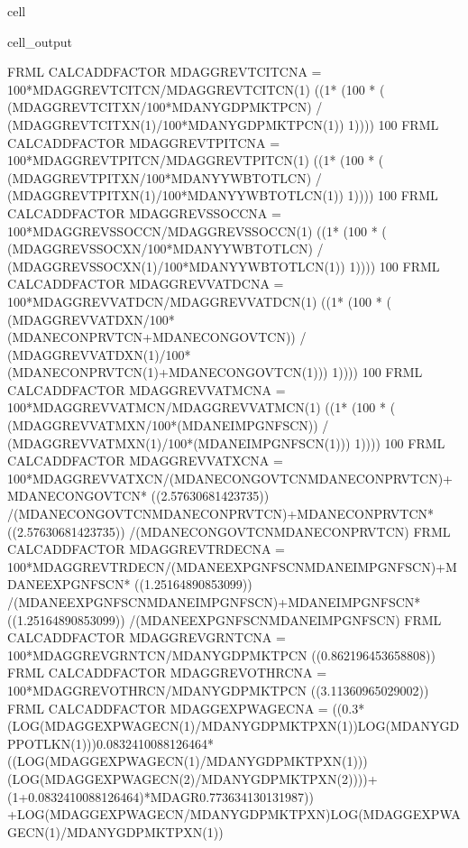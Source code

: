 \documentclass[letterpaper,10pt,english]{jupyterBook}
\begin{document}
\begin{sphinxuseclass}{cell}
\begin{sphinxVerbatimOutput}
\begin{sphinxuseclass}{cell_output}
\begin{sphinxVerbatim}[commandchars=\\\{\}]
FRML \PYGZlt{}CALC\PYGZus{}ADD\PYGZus{}FACTOR\PYGZgt{} MDAGGREVTCITCN\PYGZus{}A = 100*MDAGGREVTCITCN/MDAGGREVTCITCN(\PYGZhy{}1)\PYGZhy{} ((1* (100 * ( (MDAGGREVTCITXN/100*MDANYGDPMKTPCN) / (MDAGGREVTCITXN(\PYGZhy{}1)/100*MDANYGDPMKTPCN(\PYGZhy{}1)) \PYGZhy{}1)))) \PYGZhy{}100\PYGZdl{}
FRML \PYGZlt{}CALC\PYGZus{}ADD\PYGZus{}FACTOR\PYGZgt{} MDAGGREVTPITCN\PYGZus{}A = 100*MDAGGREVTPITCN/MDAGGREVTPITCN(\PYGZhy{}1)\PYGZhy{} ((1* (100 * ( (MDAGGREVTPITXN/100*MDANYYWBTOTLCN) / (MDAGGREVTPITXN(\PYGZhy{}1)/100*MDANYYWBTOTLCN(\PYGZhy{}1)) \PYGZhy{}1)))) \PYGZhy{}100\PYGZdl{}
FRML \PYGZlt{}CALC\PYGZus{}ADD\PYGZus{}FACTOR\PYGZgt{} MDAGGREVSSOCCN\PYGZus{}A = 100*MDAGGREVSSOCCN/MDAGGREVSSOCCN(\PYGZhy{}1)\PYGZhy{} ((1* (100 * ( (MDAGGREVSSOCXN/100*MDANYYWBTOTLCN) / (MDAGGREVSSOCXN(\PYGZhy{}1)/100*MDANYYWBTOTLCN(\PYGZhy{}1)) \PYGZhy{}1)))) \PYGZhy{}100\PYGZdl{}
FRML \PYGZlt{}CALC\PYGZus{}ADD\PYGZus{}FACTOR\PYGZgt{} MDAGGREVVATDCN\PYGZus{}A = 100*MDAGGREVVATDCN/MDAGGREVVATDCN(\PYGZhy{}1)\PYGZhy{} ((1* (100 * ( (MDAGGREVVATDXN/100*(MDANECONPRVTCN+MDANECONGOVTCN)) / (MDAGGREVVATDXN(\PYGZhy{}1)/100*(MDANECONPRVTCN(\PYGZhy{}1)+MDANECONGOVTCN(\PYGZhy{}1))) \PYGZhy{}1)))) \PYGZhy{}100\PYGZdl{}
FRML \PYGZlt{}CALC\PYGZus{}ADD\PYGZus{}FACTOR\PYGZgt{} MDAGGREVVATMCN\PYGZus{}A = 100*MDAGGREVVATMCN/MDAGGREVVATMCN(\PYGZhy{}1)\PYGZhy{} ((1* (100 * ( (MDAGGREVVATMXN/100*(MDANEIMPGNFSCN)) / (MDAGGREVVATMXN(\PYGZhy{}1)/100*(MDANEIMPGNFSCN(\PYGZhy{}1))) \PYGZhy{}1)))) \PYGZhy{}100\PYGZdl{}
FRML \PYGZlt{}CALC\PYGZus{}ADD\PYGZus{}FACTOR\PYGZgt{} MDAGGREVVATXCN\PYGZus{}A = \PYGZhy{}100*MDAGGREVVATXCN/(\PYGZhy{}MDANECONGOVTCN\PYGZhy{}MDANECONPRVTCN)+MDANECONGOVTCN* ((2.57630681423735)) /(\PYGZhy{}MDANECONGOVTCN\PYGZhy{}MDANECONPRVTCN)+MDANECONPRVTCN* ((2.57630681423735)) /(\PYGZhy{}MDANECONGOVTCN\PYGZhy{}MDANECONPRVTCN)\PYGZdl{}
FRML \PYGZlt{}CALC\PYGZus{}ADD\PYGZus{}FACTOR\PYGZgt{} MDAGGREVTRDECN\PYGZus{}A = \PYGZhy{}100*MDAGGREVTRDECN/(\PYGZhy{}MDANEEXPGNFSCN\PYGZhy{}MDANEIMPGNFSCN)+MDANEEXPGNFSCN* ((1.25164890853099)) /(\PYGZhy{}MDANEEXPGNFSCN\PYGZhy{}MDANEIMPGNFSCN)+MDANEIMPGNFSCN* ((1.25164890853099)) /(\PYGZhy{}MDANEEXPGNFSCN\PYGZhy{}MDANEIMPGNFSCN)\PYGZdl{}
FRML \PYGZlt{}CALC\PYGZus{}ADD\PYGZus{}FACTOR\PYGZgt{} MDAGGREVGRNTCN\PYGZus{}A = 100*MDAGGREVGRNTCN/MDANYGDPMKTPCN\PYGZhy{} ((0.862196453658808)) \PYGZdl{}
FRML \PYGZlt{}CALC\PYGZus{}ADD\PYGZus{}FACTOR\PYGZgt{} MDAGGREVOTHRCN\PYGZus{}A = 100*MDAGGREVOTHRCN/MDANYGDPMKTPCN\PYGZhy{} ((3.11360965029002)) \PYGZdl{}
FRML \PYGZlt{}CALC\PYGZus{}ADD\PYGZus{}FACTOR\PYGZgt{} MDAGGEXPWAGECN\PYGZus{}A = \PYGZhy{} ((\PYGZhy{}0.3*(LOG(MDAGGEXPWAGECN(\PYGZhy{}1)/MDANYGDPMKTPXN(\PYGZhy{}1))\PYGZhy{}LOG(MDANYGDPPOTLKN(\PYGZhy{}1)))\PYGZhy{}0.0832410088126464*((LOG(MDAGGEXPWAGECN(\PYGZhy{}1)/MDANYGDPMKTPXN(\PYGZhy{}1)))\PYGZhy{}(LOG(MDAGGEXPWAGECN(\PYGZhy{}2)/MDANYGDPMKTPXN(\PYGZhy{}2))))+(1+0.0832410088126464)*MDAGR\PYGZhy{}0.773634130131987)) +LOG(MDAGGEXPWAGECN/MDANYGDPMKTPXN)\PYGZhy{}LOG(MDAGGEXPWAGECN(\PYGZhy{}1)/MDANYGDPMKTPXN(\PYGZhy{}1))\PYGZdl{}

\end{sphinxVerbatim}
\end{sphinxuseclass}
\end{sphinxVerbatimOutput}
\end{sphinxuseclass}
\end{document}
